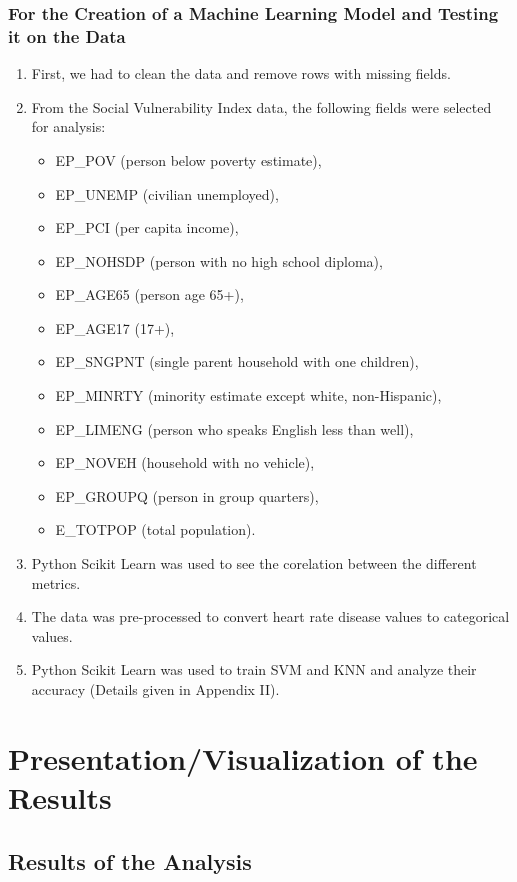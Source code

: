 \documentclass[journal,12pt,onecolumn]{IEEEtran}
\begin{document}
\subsubsection{For the Creation of a Machine Learning Model and Testing it on the Data}
\begin{enumerate}
\item First, we had to clean the data and remove rows with missing fields.
\item From the Social Vulnerability Index data, the following fields were selected for analysis: 
\begin{itemize}
\item EP\_POV (person below poverty estimate),
\item EP\_UNEMP (civilian unemployed),
\item EP\_PCI (per capita income),
\item EP\_NOHSDP (person with no high school diploma),
\item EP\_AGE65 (person age 65+),
\item EP\_AGE17 (17+),
\item EP\_SNGPNT (single parent household with one children),
\item EP\_MINRTY (minority estimate except white, non-Hispanic),
\item EP\_LIMENG (person who speaks English less than well),
\item EP\_NOVEH (household with no vehicle),
\item EP\_GROUPQ (person in group quarters),
\item E\_TOTPOP (total population).
\end{itemize}
\item Python Scikit Learn was used to see the corelation between the different metrics.
\item The data was pre-processed to convert heart rate disease values to categorical values.
\item Python Scikit Learn was used to train SVM and KNN and analyze their accuracy (Details given in Appendix II).  
\end{enumerate}

\section{Presentation/Visualization of the Results}
\subsection{Results of the Analysis}
\end{document}
